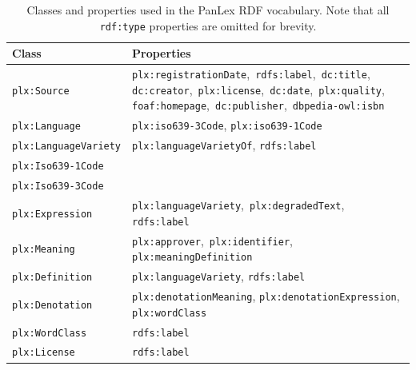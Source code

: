 \documentclass[sw]{iosart2c}
\begin{document}
\begin{table}
  \begin{tiny}
  \begin{tabular}{p{52px}p{140px}}
    Class                 & Properties \\
    \toprule
    \texttt{plx:Source} & \mbox{\texttt{plx:registrationDate}, \texttt{rdfs:label}, \texttt{dc:title},}
                            \mbox{\texttt{dc:creator}, \texttt{plx:license}, \texttt{dc:date}, \texttt{plx:quality},}
                            \mbox{\texttt{foaf:homepage}, \texttt{dc:publisher}, \texttt{dbpedia-owl:isbn}} \\
    \midrule
    \texttt{plx:Language} & \texttt{plx:iso639-3Code}, \texttt{plx:iso639-1Code} \\
    \midrule
    \texttt{plx:LanguageVariety}
                          & \texttt{plx:languageVarietyOf}, \texttt{rdfs:label} \\
    \midrule
    \texttt{plx:Iso639-1Code} & \\
    \midrule
    \texttt{plx:Iso639-3Code} & \\
    \midrule
    \texttt{plx:Expression}
                          & \mbox{\texttt{plx:languageVariety}, \texttt{plx:degradedText},} \texttt{rdfs:label} \\
    \midrule
    \texttt{plx:Meaning}
                          & \mbox{\texttt{plx:approver}, \texttt{plx:identifier},} \texttt{plx:meaningDefinition} \\
    \midrule
    \texttt{plx:Definition}
                          & \texttt{plx:languageVariety}, \texttt{rdfs:label} \\
    \midrule
    \texttt{plx:Denotation}
                          & \texttt{plx:denotationMeaning}, \texttt{plx:denotationExpression}, \texttt{plx:wordClass} \\
    \midrule
    \texttt{plx:WordClass}  
                          & \texttt{rdfs:label} \\
    \midrule
    \texttt{plx:License}  & \texttt{rdfs:label} \\
    \bottomrule
  \end{tabular}
  \end{tiny}
  \caption{Classes and properties used in the PanLex RDF vocabulary. Note that all \texttt{rdf:type} properties are omitted for brevity.}
  \label{tbl:vocabulary}
\end{table}
\end{document}
